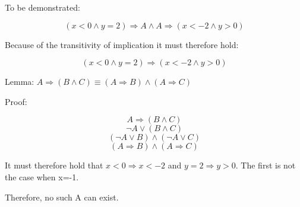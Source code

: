 To be demonstrated:

$$ (x<0 \land y=2) \Rightarrow A \land A \Rightarrow (x<-2 \land y>0) $$

Because of the transitivity of implication it must therefore hold:

$$ (x<0 \land y=2) \Rightarrow (x<-2 \land y>0) $$

Lemma: $ A \Rightarrow (B \land C) \equiv (A \Rightarrow B) \land (A \Rightarrow C) $

Proof:

$$ A \Rightarrow (B \land C) $$
$$ \neg A \lor (B \land C) $$
$$ (\neg A \lor B) \land (\neg A \lor C) $$
$$ (A \Rightarrow B) \land (A \Rightarrow C) $$

It must therefore hold that $x<0 \Rightarrow x<-2$ and $y=2 \Rightarrow y>0$. The first
is not the case when x=-1.

Therefore, no such A can exist.

\iffalse
x<0Λy=2↦x<-2Λy>0

x<0↦x<-2
y=2↦y>0

a:=x<0
b:=y=2
c:=x<-2
d:=y>0

((aΛb)↦A)Λ(A↦(cΛd))Λ(c↦a)Λ(b↦d)

c↦a (eigener Beweis?)
b↦d (eigener Beweis?)

(aΛb)↦(cΛd)
~a∨~b∨(cΛd)
~a∨((~b∨c)Λ(~b∨d))
(~a∨~b∨c)Λ(~a∨~b∨d)

(~a∨~b∨c)Λ(~a∨~b∨d)Λ(~b∨d)

In Klauselform:
{{~a,~b,c},{~a,~b,d},{~b,d},{~c,a}}
Per pure-literal-rule auf ~b:
{{~c,a}}
Per pure-literal-rule auf ~c:
{}

Deswegen nicht erfüllbar.
\fi
\bye
